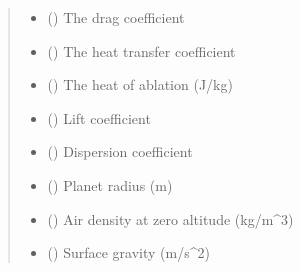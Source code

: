 \documentclass[letterpaper,10pt,english]{sphinxmanual}
\begin{document}
\begin{fulllineitems}
\begin{quote}
\begin{description}
\begin{itemize}
\item {} 
\sphinxAtStartPar
{} (\sphinxstyleliteralemphasis{\sphinxupquote{, }}) \textendash{} The drag coefficient

\item {} 
\sphinxAtStartPar
{} (\sphinxstyleliteralemphasis{\sphinxupquote{, }}) \textendash{} The heat transfer coefficient

\item {} 
\sphinxAtStartPar
{} (\sphinxstyleliteralemphasis{\sphinxupquote{, }}) \textendash{} The heat of ablation (J/kg)

\item {} 
\sphinxAtStartPar
{} (\sphinxstyleliteralemphasis{\sphinxupquote{, }}) \textendash{} Lift coefficient

\item {} 
\sphinxAtStartPar
{} (\sphinxstyleliteralemphasis{\sphinxupquote{, }}) \textendash{} Dispersion coefficient

\item {} 
\sphinxAtStartPar
{} (\sphinxstyleliteralemphasis{\sphinxupquote{, }}) \textendash{} Planet radius (m)

\item {} 
\sphinxAtStartPar
{} (\sphinxstyleliteralemphasis{\sphinxupquote{, }}) \textendash{} Air density at zero altitude (kg/m\textasciicircum{}3)

\item {} 
\sphinxAtStartPar
{} (\sphinxstyleliteralemphasis{\sphinxupquote{, }}) \textendash{} Surface gravity (m/s\textasciicircum{}2)


\end{itemize}
\end{description}
\end{quote}
\end{fulllineitems}
\end{document}
